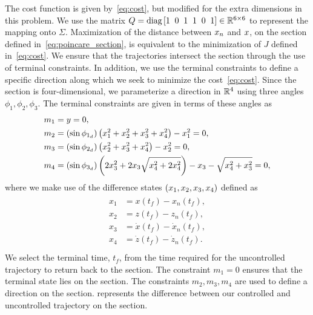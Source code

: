 The cost function is given by~\cref{eq:cost}, but modified for the extra dimensions in this problem.
We use the matrix \( Q = \text{diag} \left[ 1~\>0~\> 1~\> 1~\>0~\>1  \right] \in \mathbb{R}^{6 \times 6}\) to represent the mapping onto \( \Sigma \).
Maximization of the distance between \( x_n \) and \(x \), on the \Poincare section defined in~\cref{eq:poincare_section}, is equivalent to the minimization of \( J \) defined in~\cref{eq:cost}.
We ensure that the trajectories intersect the \Poincare section through the use of terminal constraints.
In addition, we use the terminal constraints to define a specific direction along which we seek to minimize the cost~\cref{eq:cost}.
Since the \Poincare section is four-dimensional, we parameterize a direction in \( \mathbb{R}^4 \)  using three angles \( \phi_1, \phi_2 , \phi_3 \).
The terminal constraints are given in terms of these angles as
\begin{align}\label{eq:terminal_constraints}
    \begin{split}
        m_1 &= y = 0 , \\
        m_2 &= \left( \sin \phi_{1_{d}} \right) \left(  x_1^2 + x_2^2 + x_3^2 + x_4^2 \right) - x_1^2 = 0, \\
        m_3 &= \left( \sin \phi_{2_{d}} \right) \left(  x_2^2 + x_3^2 + x_4^2 \right) - x_2^2 = 0, \\
        m_4 &= \left( \sin \phi_{3_{d}} \right) \left(  2 x_3^2 + 2 x_3 \sqrt{x_4^2 + 2 x_4^2} \right) - x_3 - \sqrt{x_4^2 + x_3^2} = 0 ,
    \end{split}
\end{align}
where we make use of the difference states \( \left( x_1, x_2 ,x_3, x_4  \right)\) defined as
\begin{align}\label{eq:diff_states}
    \begin{split}
        x_1 &= x(t_f) - x_n(t_f) , \\
        x_2 &= z(t_f) - z_n(t_f) , \\
        x_3 &= \dot{x}(t_f) - \dot{x}_n(t_f) , \\
        x_4 &= \dot{z}(t_f) - \dot{z}_n(t_f) . \\
    \end{split}
\end{align}
We select the terminal time, \( t_f \), from the time required for the uncontrolled trajectory to return back to the \Poincare section.
The constraint \( m_1 = 0 \) ensures that the terminal state lies on the \Poincare section.
The constraints \( m_2, m_3, m_4 \) are used to define a direction on the \Poincare section.
 represents the difference between our controlled and uncontrolled trajectory on the \Poincare section.

